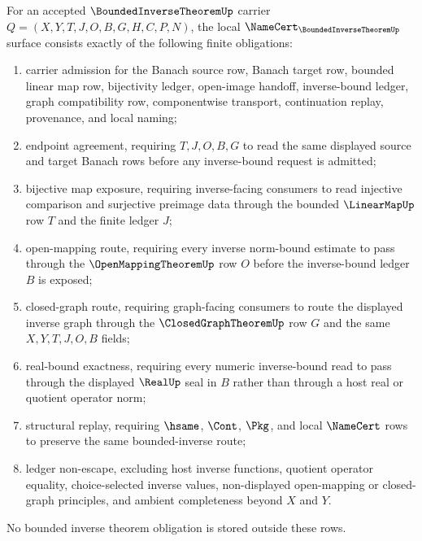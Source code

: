 \begin{theorem}
\label{thm:bounded-inverse-theorem-namecert-obligations}
For an accepted $\BoundedInverseTheoremUp$ carrier $Q=(X,Y,T,J,O,B,G,H,C,P,N)$, the local $\NameCert_{\BoundedInverseTheoremUp}$ surface consists exactly of the following finite obligations:
\begin{enumerate}
\item carrier admission for the Banach source row, Banach target row, bounded linear map row, bijectivity ledger, open-image handoff, inverse-bound ledger, graph compatibility row, componentwise transport, continuation replay, provenance, and local naming;
\item endpoint agreement, requiring $T,J,O,B,G$ to read the same displayed source and target Banach rows before any inverse-bound request is admitted;
\item bijective map exposure, requiring inverse-facing consumers to read injective comparison and surjective preimage data through the bounded $\LinearMapUp$ row $T$ and the finite ledger $J$;
\item open-mapping route, requiring every inverse norm-bound estimate to pass through the $\OpenMappingTheoremUp$ row $O$ before the inverse-bound ledger $B$ is exposed;
\item closed-graph route, requiring graph-facing consumers to route the displayed inverse graph through the $\ClosedGraphTheoremUp$ row $G$ and the same $X,Y,T,J,O,B$ fields;
\item real-bound exactness, requiring every numeric inverse-bound read to pass through the displayed $\RealUp$ seal in $B$ rather than through a host real or quotient operator norm;
\item structural replay, requiring $\hsame$, $\Cont$, $\Pkg$, and local $\NameCert$ rows to preserve the same bounded-inverse route;
\item ledger non-escape, excluding host inverse functions, quotient operator equality, choice-selected inverse values, non-displayed open-mapping or closed-graph principles, and ambient completeness beyond $X$ and $Y$.
\end{enumerate}
No bounded inverse theorem obligation is stored outside these rows.
\end{theorem}
